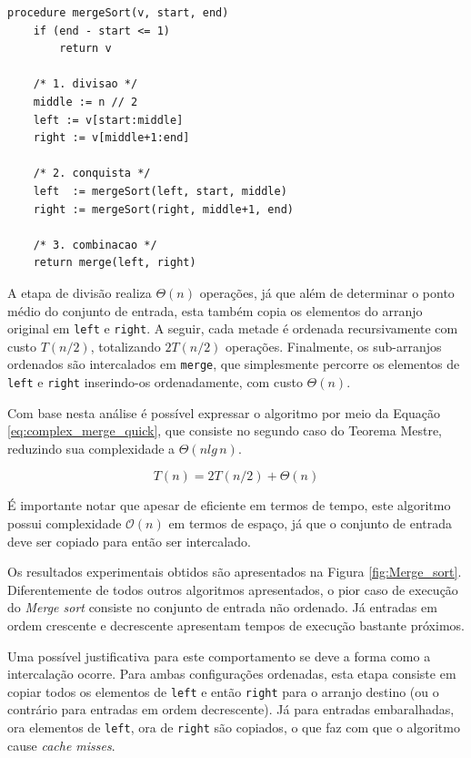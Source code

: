 \documentclass[12pt]{article}
\begin{document}
\begin{lstlisting}[caption=\textit{Merge sort}. A notação \texttt{v[a:b]} representa a criação de um novo arranjo contendo os elementos de \texttt{v} no intervalo \texttt{[a,b]}. A divisão inteira é representada por \texttt{x//y}, float, label=alg:merge_sort, captionpos=b, h]
procedure mergeSort(v, start, end)
    if (end - start <= 1)
        return v
        
    /* 1. divisao */
    middle := n // 2
    left := v[start:middle]
    right := v[middle+1:end]
    
    /* 2. conquista */
    left  := mergeSort(left, start, middle)
    right := mergeSort(right, middle+1, end)
    
    /* 3. combinacao */
    return merge(left, right)
\end{lstlisting}

A etapa de divisão realiza $\Theta(n)$ operações, já que além de determinar o ponto médio do conjunto de entrada, esta também copia os elementos do arranjo original em \texttt{left} e \texttt{right}. A seguir, cada metade é ordenada recursivamente com custo $T(n/2)$, totalizando $2T(n/2)$ operações. Finalmente, os sub-arranjos ordenados são intercalados em \texttt{merge}, que simplesmente percorre os elementos de \texttt{left} e \texttt{right} inserindo-os ordenadamente, com custo $\Theta(n)$. 

Com base nesta análise é possível expressar o algoritmo por meio da Equação \ref{eq:complex_merge_quick}, que consiste no segundo caso do Teorema Mestre, reduzindo sua complexidade a $\Theta(n lg\,n)$.

\begin{equation}
    \label{eq:complex_merge_quick}
    T(n) = 2T(n/2) + \Theta(n)
\end{equation}

É importante notar que apesar de eficiente em termos de tempo, este algoritmo possui complexidade $\mathcal{O}(n)$ em termos de espaço, já que o conjunto de entrada deve ser copiado para então ser intercalado.

Os resultados experimentais obtidos são apresentados na Figura \ref{fig:Merge_sort}. Diferentemente de todos outros algoritmos apresentados, o pior caso de execução do \textit{Merge sort} consiste no conjunto de entrada não ordenado. Já entradas em ordem crescente e decrescente apresentam tempos de execução bastante próximos.

Uma possível justificativa para este comportamento se deve a forma como a intercalação ocorre. Para ambas configurações ordenadas, esta etapa consiste em copiar todos os elementos de \texttt{left} e então \texttt{right} para o arranjo destino (ou o contrário para entradas em ordem decrescente). Já para entradas embaralhadas, ora elementos de \texttt{left}, ora de \texttt{right} são copiados, o que faz com que o algoritmo cause \textit{cache misses}.
\end{document}
